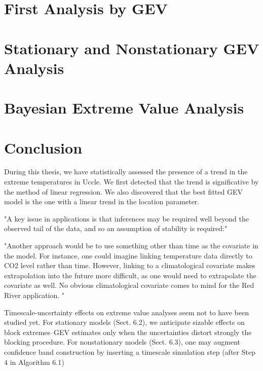 \documentclass[11pt,a4paper,openany ]{book}
\begin{document}
\chapter{First Analysis by GEV }\label{sec:anagev}
\minitoc \thispagestyle{empty}







\chapter{Stationary and Nonstationary GEV Analysis}\label{sec:ananonsta}
\minitoc \thispagestyle{empty}






\chapter{Bayesian Extreme Value Analysis}
\minitoc \thispagestyle{empty}








\chapter*{Conclusion}
\thispagestyle{empty}

During this thesis, we have statistically assessed the presence of a trend in the extreme temperatures in Uccle. We first detected that the trend is significative by the method of linear regression. We also discovered that the best fitted GEV model is the one with a linear trend in the location parameter.

"A key issue in applications is that inferences
may be required well beyond the observed tail of
the data, and so an assumption of stability is required:" \cite{davison_statistical_2012}

"Another approach would be to use something other than time as the covariate 
in the model. For instance, one could imagine linking temperature data directly to
CO2 level rather than time. However, linking to a climatological covariate makes
extrapolation into the future more difficult, as one would need to extrapolate the 
covariate as well. No obvious climatological covariate comes to mind for the Red
River application. " %


Timescale-uncertainty effects on extreme value analyses seem not to have been
studied yet. For stationary models (Sect. 6.2), we anticipate sizable effects on block
extremes–GEV estimates only when the uncertainties distort strongly the blocking
procedure. For nonstationary models (Sect. 6.3), one may augment confidence band
construction by inserting a timescale simulation step (after Step 4 in Algorithm 6.1) \citet[pp.262]{mudelsee_climate_2014}
\end{document}
